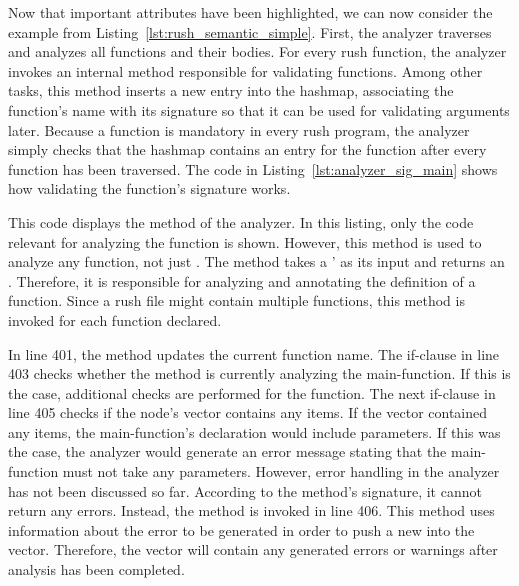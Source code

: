 Now that important attributes have been highlighted, we can now consider the example from Listing~\ref{lst:rush_semantic_simple}.
First, the analyzer traverses and analyzes all functions and their bodies.
For every rush function, the analyzer invokes an internal method responsible for validating functions.
Among other tasks, this method inserts a new entry into the  hashmap,
associating the function's name with its signature so that it can be used for validating arguments later.
Because a  function is mandatory in every rush program,
the analyzer simply checks that the  hashmap contains an entry for the  function after every function has been traversed.
The code in Listing~\ref{lst:analyzer_sig_main} shows how validating the  function's signature works.


This code displays the  method of the analyzer.
In this listing, only the code relevant for analyzing the  function is shown.
However, this method is used to analyze any function, not just .
The method  takes a ' as its input and returns an .
Therefore, it is responsible for analyzing and annotating the definition of a function.
Since a rush file might contain multiple functions, this method is invoked for each function declared.

In line 401, the method updates the current function name.
The if-clause in line 403 checks whether the method is currently analyzing the main-function.
If this is the case, additional checks are performed for the  function.
The next if-clause in line 405 checks if the node's  vector contains any items.
If the vector contained any items, the main-function's declaration would include parameters.
If this was the case, the analyzer would generate an error message stating that the main-function must not take any parameters.
However, error handling in the analyzer has not been discussed so far.
According to the method's signature, it cannot return any errors.
Instead, the  method is invoked in line 406.
This method uses information about the error to be generated in order to push a new  into the  vector.
Therefore, the vector will contain any generated errors or warnings after analysis has been completed.

